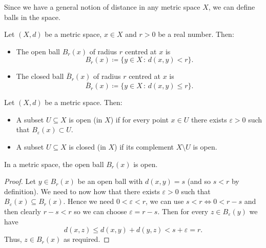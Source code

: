 \documentclass[10pt, a4paper]{article}
\begin{document}
Since we have a general notion of distance in any metric space $X$,
we can define balls in the space.

\begin{definition}
    Let $(X, d)$ be a metric space,
    $x \in X$ and $r > 0$ be a real number.
    Then:
    \begin{itemize}
        \item The open ball $B_r(x)$ of radius $r$ centred at $x$ is
        \[
        B_r(x) \coloneqq \{y \in X\,:\,d(x, y) < r\}.
        \]

        \item The closed ball $\bar{B}_r(x)$ of radius $r$ centred at $x$ is
        \[
        \bar{B}_r(x) \coloneqq \{y \in X\,:\,d(x, y) \leq r\}.
        \]
    \end{itemize}
\end{definition}

\begin{definition}
    Let $(X, d)$ be a metric space.
    Then:
    \begin{itemize}
        \item A subset $U \subseteq X$ is open
        (in $X$)
        if for every point $x \in U$ there exists $\varepsilon > 0$ such that $B_{\varepsilon}(x) \subset U$.

        \item A subset $U \subseteq X$ is closed
        (in $X$)
        if its complement $X \setminus U$ is open.
    \end{itemize}
    
\end{definition}

\begin{lemma}
    In a metric space,
    the open ball $B_r(x)$ is open.

    \begin{proof}
        Let $y \in B_r(x)$ be an open ball with $d(x, y) = s$
        (and so $s < r$ by definition).
        We need to now how that there exists $\varepsilon > 0$ such that $B_{\varepsilon}(x) \subseteq B_r(x)$.
        Hence we need $0 < \varepsilon < r$,
        we can use $s < r \iff 0 < r - s$ and then clearly $r - s < r$ so we can choose $\varepsilon = r - s$.
        Then for every $z \in B_{\varepsilon}(y)$ we have
        \[
        d(x, z) \leq d(x, y) + d(y, z) < s + \varepsilon = r.
        \]
        Thus,
        $z \in B_r(x)$ as required.
    \end{proof}
\end{lemma}
\end{document}
